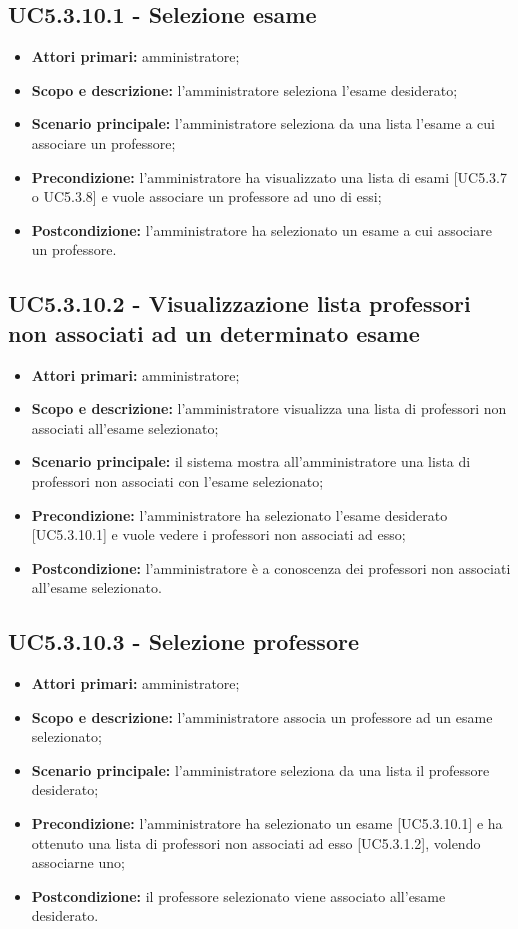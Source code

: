 \documentclass[AnalisiDeiRequisiti.tex]{subfiles}
\begin{document}
\subsection{UC5.3.10.1 - Selezione esame}
\begin{itemize}
	\item \textbf{Attori primari:} amministratore;
	\item \textbf{Scopo e descrizione:} l'amministratore seleziona l'esame desiderato;
	\item \textbf{Scenario principale:} l'amministratore seleziona da una lista l'esame a cui associare un professore;
	\item \textbf{Precondizione:} l'amministratore ha visualizzato una lista di esami [UC5.3.7 o UC5.3.8] e vuole associare un professore ad uno di essi; 
	\item \textbf{Postcondizione:} l'amministratore ha selezionato un esame a cui associare un professore.
\end{itemize}
\subsection{UC5.3.10.2 - Visualizzazione lista professori non associati ad un determinato esame}
\begin{itemize}
	\item \textbf{Attori primari:} amministratore;
	\item \textbf{Scopo e descrizione:} l'amministratore visualizza una lista di professori non associati all'esame selezionato;
	\item \textbf{Scenario principale:} il sistema mostra all'amministratore una lista di professori non associati con l'esame selezionato;
	\item \textbf{Precondizione:} l'amministratore ha selezionato l'esame desiderato [UC5.3.10.1] e vuole vedere i professori non associati ad esso;  
	\item \textbf{Postcondizione:} l'amministratore è a conoscenza dei professori non associati all'esame selezionato.
\end{itemize}
\subsection{UC5.3.10.3 - Selezione professore}
\begin{itemize}
	\item \textbf{Attori primari:} amministratore;
	\item \textbf{Scopo e descrizione:} l'amministratore associa un professore ad un esame selezionato;
	\item \textbf{Scenario principale:} l'amministratore seleziona da una lista il professore desiderato;
	\item \textbf{Precondizione:} l'amministratore ha selezionato un esame [UC5.3.10.1] e ha ottenuto una lista di professori non associati ad esso [UC5.3.1.2], volendo associarne uno; 
	\item \textbf{Postcondizione:} il professore selezionato viene associato all'esame desiderato.
\end{itemize}
\end{document}
